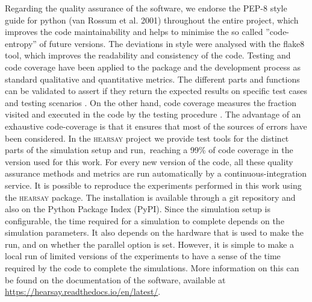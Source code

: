 \documentclass[crop]{CSLB}
\newcommand{\hs}{\textsc{hearsay}}
\begin{document}
%
Regarding the quality assurance of the software, we endorse the PEP-8
style guide for python (van Rossum et al. 2001) throughout the entire
project, which improves the code maintainability and helps to minimise
the so called ''code-entropy'' of future versions.
%
The deviations in style were analysed with the flake8 tool, which
improves the readability and consistency of the code.
%
Testing and code coverage have been applied to the package and the
development process as standard qualitative and quantitative metrics.
%
The different parts and functions can be validated to assert if they
return the expected results on specific test cases and testing
scenarios \citep{jazayeri_engeneering_2007}.
%
On the other hand, code coverage measures the fraction visited and
executed in the code by the testing procedure
\citep{miller_testing_1963}.
%
The advantage of an exhaustive code-coverage is that it ensures that
most of the sources of errors have been considered.
%
In the \hs{} project we provide test tools for the distinct parts of
the simulation setup and run, reaching a 99\% of code coverage in the
version used for this work.
%
For every new version of the code, all these quality assurance methods
and metrics are run automatically by a continuous-integration service.
%
It is possible to reproduce the experiments performed in this work
using the \hs{} package.
%
The installation is available through a git repository and also on the
Python Package Index (PyPI).
%
Since the simulation setup is configurable, the time required for a
simulation to complete depends on the simulation parameters.
%
It also depends on the hardware that is used to make the run, and on whether the parallel option is set.
%
However, it is simple to make a local run of limited versions of the experiments to have a sense of the time required by
the code to complete the simulations.
%
More information on this can be found on the documentation of the software, available at
\url{https://hearsay.readthedocs.io/en/latest/}.
















\end{document}
